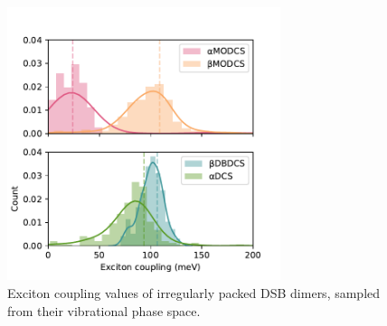 \begin{figure}
\centering
\includegraphics[width=8cm]{Chapters/7Applications/hist.pdf}
\caption{Exciton coupling values of irregularly packed DSB dimers, sampled from their vibrational phase space.}
\label{fig:hist}
\end{figure}


